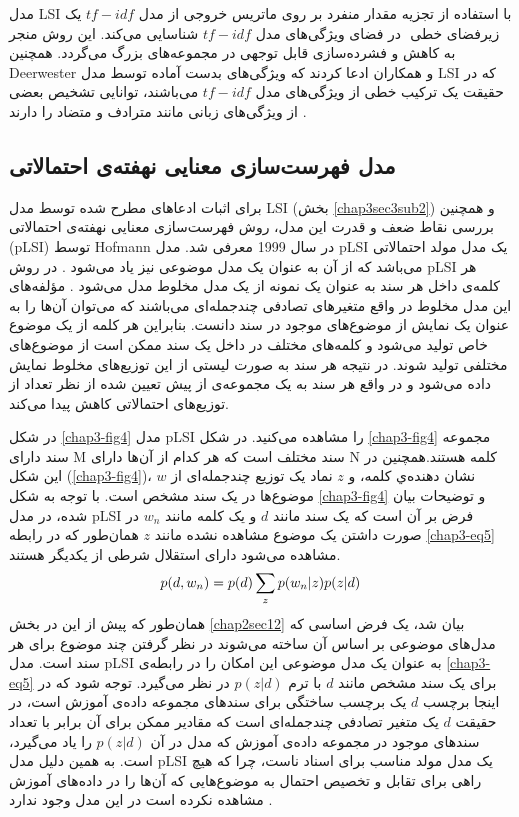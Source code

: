 	مدل
	LSI
	با استفاده از تجزیه مقدار منفرد
	 بر روی ماتریس خروجی از مدل
	$tf-idf$
	یک زیرفضای خطی
	‌ در فضای ویژگی‌‌های مدل
	$tf-idf$
	شناسایی می‌‌کند. این روش منجر به کاهش و فشرده‌سازی قابل توجهی‌ در مجموعه‌های بزرگ می‌‌گردد. همچنین
	Deerwester
	و همکاران ادعا کردند که ویژگی‌‌های بدست آماده توسط مدل
	LSI
	که در حقیقت یک ترکیب خطی‌ از ویژگی‌‌های مدل
	$tf-idf$
	می‌باشند، توانایی تشخیص بعضی‌ از ویژگی‌‌های زبانی مانند مترادف و متضاد را دارند
	\cite{deerwester1990indexing}.
	
	\subsection{مدل فهرست‌سازی معنایی نهفته‌ی احتمالاتی}
	\label{chap3sec3sub3}
	برای اثبات ادعا‌های مطرح شده توسط مدل
	LSI (بخش \ref{chap3sec3sub2})
	و همچنین بررسی‌ نقاط ضعف و قدرت این مدل، روش فهرست‌سازی معنایی نهفته‌ی احتمالاتی (pLSI)
	 توسط 
	Hofmann \cite{hofmann1999probabilistic}
در سال 1999 معرفی شد. مدل 
	pLSI
	یک مدل مولد احتمالاتی می‌باشد که از آن به عنوان یک مدل موضوعی نیز یاد می‌شود
	\cite{blei2003latent}.
	 در روش 
	 pLSI
	 هر کلمه‌ی داخل هر سند به عنوان یک نمونه از یک مدل مخلوط مدل می‌شود
	 \cite{hofmann1999probabilistic}.
	  مؤلفه‌های این مدل مخلوط در واقع متغیرهای تصادفی چندجمله‌ای می‌باشند که می‌توان آن‌ها را به عنوان یک نمایش از موضوع‌های موجود در سند دانست. بنابراین هر کلمه از یک موضوع خاص تولید می‌‌شود و کلمه‌های مختلف در داخل یک سند ممکن است از موضوع‌های مختلفی‌ تولید شوند. در نتیجه هر سند به صورت لیستی از این توزیع‌های مخلوط نمایش داده می‌‌شود و در واقع هر سند به یک مجموعه‌ی از پیش تعیین شده از نظر تعداد از توزیع‌های احتمالاتی کاهش پیدا می‌کند.
	
	در شکل
	\ref{chap3-fig4}
	مدل
	pLSI
	را مشاهده می‌کنید‌. در شکل
	\ref{chap3-fig4}
	 مجموعه سند دارای
	M
	سند مختلف است که هر کدام از آن‌ها دارای
	N
	کلمه‌ هستند.همچنین در این شکل
	(\ref{chap3-fig4})، $w$
	نشان دهنده‌ي کلمه، و
	$z$
	نماد یک توزیع چندجمله‌ای از موضوع‌ها در یک سند مشخص است. با توجه به شکل
	\ref{chap3-fig4}
	و توضیحات بیان شده، در مدل
	pLSI
	فرض بر آن است که یک سند مانند
	$d$
	و یک کلمه‌ مانند
	$w_n$
	در صورت داشتن یک موضوع مشاهده نشده مانند
	$z$
	همان‌طور که در رابطه
	\ref{chap3-eq5}
	مشاهده می‌‌شود دارای استقلال شرطی از یکدیگر هستند.
	\begin{align}
	\centering
	\label{chap3-eq5}
		p(d,w_n) = p(d) \sum_{z} p(w_n|z)p(z|d)
	\end{align}
	همان‌طور که پیش از این در بخش
	\ref{chap2sec12}
	بیان شد، یک فرض اساسی‌ که مدل‌های موضوعی بر اساس آن ساخته می‌‌شوند در نظر گرفتن چند موضوع برای هر سند است. مدل
	pLSI
	به عنوان یک مدل موضوعی این امکان را در رابطه‌ی
	\ref{chap3-eq5}
	برای یک سند مشخص مانند
	$d$
	با ترم
	$p(z|d)$
	در نظر می‌‌گیرد. توجه شود که در اینجا برچسب
	$d$
	یک برچسب ساختگی برای سند‌های مجموعه داده‌ی آموزش است، در حقیقت
	$d$
	یک متغیر تصادفی چندجمله‌ای است که مقادیر ممکن برای آن برابر با تعداد سند‌های موجود در مجموعه داده‌ی آموزش که مدل در آن
	$p(z|d)$
	را یاد می‌‌گیرد، است. به همین دلیل مدل
	pLSI
	یک مدل مولد مناسب برای اسناد‌ ناست، چرا که هیچ راهی‌ برای تقابل و تخصیص احتمال به موضوع‌هایی که آن‌ها را در داده‌های آموزش مشاهده 
	نکرده است در این مدل وجود ندارد
	\cite{blei2003latent}.
	
